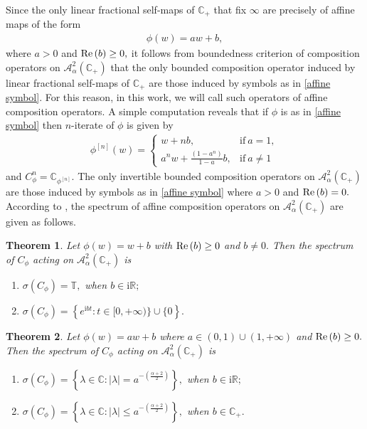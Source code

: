 \documentclass[11pt]{amsart}%
\numberwithin{equation}{section}
\theoremstyle{plain}
\newtheorem{thm}{Theorem}[section]
\theoremstyle{definition}
\theoremstyle{definition}
\newcommand{\re}{{\rm Re}\,}
\newcommand{\hb}{\mathbb{C}_+}
\newcommand{\Ber}{\mathcal{A}^2_{\alpha}(\hb)}
\newcommand{\I}{\mathrm{i}}
\newcommand {\C} {\mathbb C}
\begin{document}
Since the only linear fractional self-maps of $\hb$ that fix $\infty$ are precisely of affine maps of the form
\begin{align}\label{affine symbol}
\phi(w)=a w+b,  
\end{align}
where $a>0$ and $\re(b)\geq 0,$ it follows from boundedness criterion of composition operators on $\Ber$ that the only bounded composition operator induced by linear fractional self-maps of $\hb$ are those induced by symbols as in \eqref{affine symbol}. For this reason, in this work, we will call such operators of affine composition operators. A simple computation reveals that if $\phi$ is as in \eqref{affine symbol} then $n$-iterate of $\phi$ is given by
\begin{align}\label{iterate}
\phi^{[n]}(w)= \begin{cases}w+nb, & \text{if} \ a=1, \\ 
a^{n} w+\frac{\left(1-a^{n}\right)}{1-a}b,  & \text{if} \ a \neq 1 
\end{cases}
\end{align}	
and $C_{\phi}^n=\C_{\phi^{[n]}}.$  The only invertible bounded composition operators on $\Ber$ are those induced by symbols as in \eqref{affine symbol} where $a>0$ and $\re(b)=0.$ According to \cite[Theorem 3.1]{Chalendar}, the spectrum of affine composition operators on $\Ber$ are given as follows.

\begin{thm}\label{spectrum parabolic} Let $\phi(w)=w+b$ with $\re(b)\geq 0$ and $b\neq 0.$ Then the spectrum of $C_{\phi}$ acting on $\Ber$ is
\begin{enumerate}[label=\textnormal{(\roman*)}]
\item $\sigma(C_{\phi})=\mathbb{T},$ when $b\in \mathrm{i}\mathbb{R};$
\item $\sigma(C_{\phi})=\left\{e^{\I bt}:t\in [0, +\infty)\}\cup\{0\right\}.$
\end{enumerate}
\end{thm}

\begin{thm}\label{spectrum hyperbolic} Let $\phi(w)=a w+b$ where $a \in (0,1)\cup(1,+\infty)$ and $\re(b)\geq 0.$ Then the spectrum of $C_{\phi}$ acting on $\Ber$ is
\begin{enumerate}[label=\textnormal{(\roman*)}]
\item $\sigma(C_{\phi})=\left\{\lambda \in \mathbb{C}:|\lambda|=a ^{-\left(\frac{\alpha+2}{2}\right)}\right\},$ when $b\in \mathrm{i}\mathbb{R};$
\item $\sigma(C_{\phi})=\left\{\lambda \in \mathbb{C}:|\lambda|\leq a ^{-\left(\frac{\alpha+2}{2}\right)}\right\},$ when $b\in \hb.$
\end{enumerate}
\end{thm}
\end{document}
